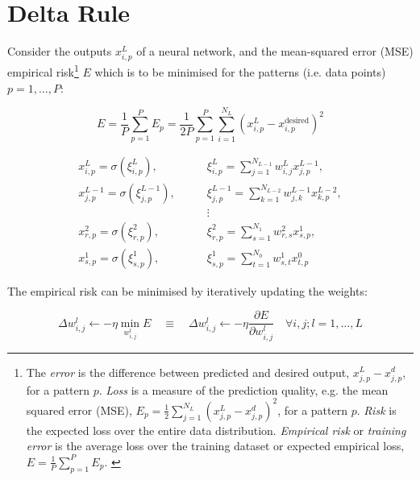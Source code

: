 \section{Delta Rule}
\label{appendix:delta-rule}

Consider the outputs $x_{i, p}^L$ of a neural network, and the mean-squared error (MSE)
empirical risk\footnote{
The \textit{error} is the difference between predicted and desired output, $x_{j, p}^L - x_{j, p}^d$, for a pattern $p$.
\textit{Loss} is a measure of the prediction quality, e.g. the mean squared error (MSE), $E_p = \frac{1}{2} \sum_{j=1}^{N_L}{( x_{j, p}^L - x_{j, p}^d )^2}$, for a pattern $p$.
\textit{Risk} is the expected loss over the entire data distribution.
\textit{Empirical risk} or \textit{training error} is the average loss over the training dataset or expected empirical loss, $E = \frac{1}{P} \sum_{p=1}^P{ E_p }$.
\citep{wikipedia2025empiricalriskminimization}
} $E$ which is to be minimised for the patterns (i.e. data points) $p = 1, \dots, P$:

\begin{equation}
    E = \frac{1}{P} \sum_{p=1}^P{ E_p }
    = \frac{1}{2P} \sum_{p=1}^P{ \sum_{i=1}^{N_L}{ (x_{i, p}^L - x_{i, p}^\text{desired})^2 } }
\end{equation}

\begin{equation}
\begin{split}
    x_{i, p}^L = \sigma( \xi_{i, p}^L ), \qquad
    & \xi_{i, p}^L = \sum_{j = 1}^{N_{L-1}}{ w_{i, j}^L x_{j, p}^{L-1} }, \\
    x_{j, p}^{L-1} = \sigma( \xi_{j, p}^{L-1} ), \qquad
    & \xi_{j, p}^{L-1} = \sum_{k = 1}^{N_{L-2}}{ w_{j, k}^{L-1} x_{k, p}^{L-2} }, \\
    & \vdots \\
    x_{r, p}^2 = \sigma( \xi_{r, p}^2 ), \qquad
    & \xi_{r, p}^2 = \sum_{s = 1}^{N_1}{ w_{r, s}^2 x_{s, p}^1 }, \\
    x_{s, p}^1 = \sigma( \xi_{s, p}^1 ), \qquad
    & \xi_{s, p}^1 = \sum_{t = 1}^{N_0}{ w_{s, t}^1 x_{t, p}^0 }
    \label{eq:outputs}
\end{split}
\end{equation}

The empirical risk can be minimised by iteratively updating the weights:

\begin{equation}
    \Delta w_{i, j}^l \leftarrow - \eta \min_{w_{i, j}^l}{E} \quad \equiv \quad
    \Delta w_{i, j}^l \leftarrow - \eta \frac{\partial E}{\partial w_{i, j}^l} \quad \forall i, j; l = 1, \dots, L
\end{equation}

